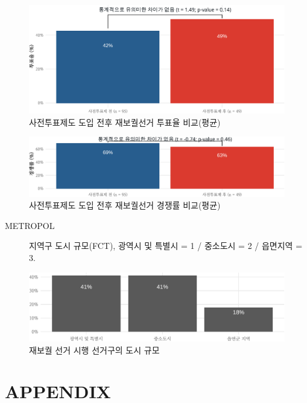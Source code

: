 \documentclass[
  11pt,
  letter]{article}
\begin{document}
\begin{figure}
\centering
\includegraphics{Codebook_national_files/figure-latex/unnamed-chunk-21-1.pdf}
\caption{사전투표제도 도입 전후 재보궐선거 투표율 비교(평균)}
\end{figure}

\begin{figure}
\centering
\includegraphics{Codebook_national_files/figure-latex/unnamed-chunk-22-1.pdf}
\caption{사전투표제도 도입 전후 재보궐선거 경쟁률 비교(평균)}
\end{figure}

\begin{description}
\item[METROPOL]
지역구 도시 규모(FCT), 광역시 및 특별시 = 1 / 중소도시 = 2 / 읍면지역 =
3.
\end{description}

\begin{figure}
\centering
\includegraphics{Codebook_national_files/figure-latex/unnamed-chunk-23-1.pdf}
\caption{재보궐 선거 시행 선거구의 도시 규모}
\end{figure}

\newpage

\hypertarget{appendix}{%
\section{APPENDIX}\label{appendix}}
\end{document}
